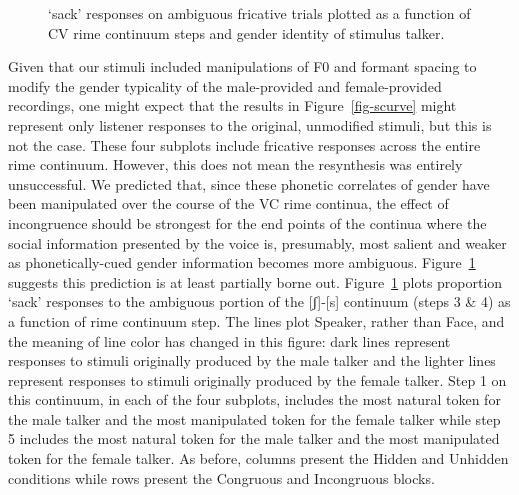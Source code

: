 \documentclass[
  letterpaper,
  DIV=11,
  numbers=noendperiod]{scrartcl}
\begin{document}
\begin{figure}


\caption{\label{fig-rimes}`sack' responses on ambiguous fricative trials
plotted as a function of CV rime continuum steps and gender identity of
stimulus talker.}

\end{figure}%

Given that our stimuli included manipulations of F0 and formant spacing
to modify the gender typicality of the male-provided and female-provided
recordings, one might expect that the results in Figure~\ref{fig-scurve}
might represent only listener responses to the original, unmodified
stimuli, but this is not the case. These four subplots include fricative
responses across the entire rime continuum. However, this does not mean
the resynthesis was entirely unsuccessful. We predicted that, since
these phonetic correlates of gender have been manipulated over the
course of the VC rime continua, the effect of incongruence should be
strongest for the end points of the continua where the social
information presented by the voice is, presumably, most salient and
weaker as phonetically-cued gender information becomes more ambiguous.
Figure~\ref{fig-rimes} suggests this prediction is at least partially
borne out. Figure~\ref{fig-rimes} plots proportion `sack' responses to
the ambiguous portion of the {[}ʃ{]}-{[}s{]} continuum (steps 3 \& 4) as
a function of rime continuum step. The lines plot Speaker, rather than
Face, and the meaning of line color has changed in this figure: dark
lines represent responses to stimuli originally produced by the male
talker and the lighter lines represent responses to stimuli originally
produced by the female talker. Step 1 on this continuum, in each of the
four subplots, includes the most natural token for the male talker and
the most manipulated token for the female talker while step 5 includes
the most natural token for the male talker and the most manipulated
token for the female talker. As before, columns present the Hidden and
Unhidden conditions while rows present the Congruous and Incongruous
blocks.
\end{document}
